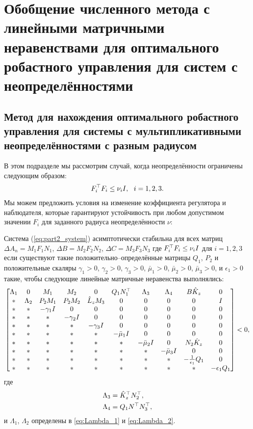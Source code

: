 \chapter{Обобщение численного метода с линейными матричными неравенствами для оптимального робастного управления для систем с неопределённостями}\label{ch:ch4}
\section{Метод для нахождения оптимального робастного управления для системы с мультипликативными неопределённостями с разным радиусом}\label{sec:ch4/sect1}

В этом подразделе мы рассмотрим случай, когда неопределённости ограничены следующим образом:
%
\begin{equation}
	\label{eq:part2_nu_uncertainty}
	{F}_i^\top{F}_i\leq \nu_i {I}, \ \ i=1,2,3.
\end{equation}
%
Мы можем предложить условия на изменение коэффициента регулятора и наблюдателя, которые гарантируют устойчивость при любом допустимом значении ${F}_i$ для заданного радиуса неопределённости $\nu$:
\begin{theorem}\label{thm:part2_LMI_2}
	Система (\ref{eq:part2_system}) асимптотически стабильна для всех матриц
	$\Delta {A}_n={M}_1{F}_1{N}_1$, 
	$\Delta {B}= {M}_2{F}_2{N}_2$, 
	$\Delta {C} = {M}_3{F}_3{N}_3$
	где
	${F}_i^\top{F}_i\leq \nu_i {I}$ для $i=1,2,3$
	если существуют такие положительно--определённые матрицы ${Q}_1$, ${P}_2$ и положительные скаляры
	$\gamma_1>0$, $\gamma_2>0$, $\gamma_3>0$, $\bar{\mu}_1>0$, $\bar{\mu}_2>0$, $\bar{\mu}_3>0$, и $\epsilon_1 > 0$ такие, чтобы следующие линейные матричные неравенства выполнялись:
	\begin{equation}
		\label{eq:thm4_final_LMI}
		\begin{bmatrix}
			{\Lambda}_1 & 0 & {M}_1 & {M}_2&0 & {Q}_1{N}_1^\top & {\Lambda}_3 &{\Lambda}_4 & {B}\hat{{K}}_z & 0\\
			* & {\Lambda}_2 & {P}_2{M}_1 & {P}_2{M}_2 & \hat{{L}}_z{M}_3& 0& 0&0&0&{I} \\
			* & * & -\gamma_1{I} & 0&0&0&0&0&0&0\\
			* & * &*  & -\gamma_2{I}&0&0&0&0&0&0\\
			*& * & * &*  & -\gamma_3{I}&0&0&0&0&0\\
			* &* & * & * & *&-\bar{\mu}_1{I}&0&0&0&0\\
			* & * & * &*& *&*&-\bar{\mu}_2{I}& 0&{N}_2\hat{{K}}_z&0\\
			*&*&* &* & * & * & *&-\bar{\mu}_3{I}&0&0\\
			* & * & *&*&* & *&*&*&-\frac{1}{\epsilon_1}{Q}_1&0\\
			* & * & * & *&*&*&*&*&*&-\epsilon_1{Q}_1\\
		\end{bmatrix}<0,
	\end{equation}
	где
	\begin{align}
		{\Lambda}_3&=\hat{{K}}_z^\top{N}_2^\top,\\ {\Lambda}_4&={Q}_1{N}^\top{N}_3^\top,
	\end{align}
	и ${\Lambda}_1$, ${\Lambda}_2$ определены в \eqref{eq:Lambda_1} и \eqref{eq:Lambda_2}. 
\end{theorem}
